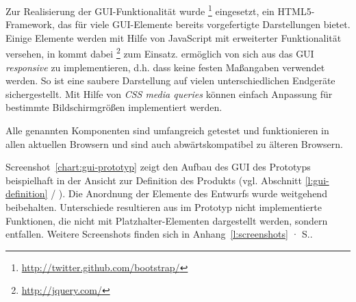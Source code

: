 Zur Realisierung der GUI-Funktionalität wurde \footnote{\url{http://twitter.github.com/bootstrap/}} eingesetzt, ein HTML5-Framework, das für viele GUI-Elemente bereits vorgefertigte Darstellungen bietet. Einige Elemente werden mit Hilfe von JavaScript mit erweiterter Funktionalität versehen, in  kommt dabei \footnote{\url{http://jquery.com/}} zum Einsatz.  ermöglich von sich aus das GUI \emph{responsive} zu implementieren, d.h. dass keine festen Maßangaben verwendet werden. So ist eine saubere Darstellung auf vielen unterschiedlichen Endgeräte sichergestellt. Mit Hilfe von \emph{CSS media queries} können einfach Anpassung für bestimmte Bildschirmgrößen implementiert werden.

Alle genannten Komponenten sind umfangreich getestet und funktionieren in allen aktuellen Browsern und sind auch abwärtskompatibel zu älteren Browsern.

\setlength\fboxsep{2pt}
\setlength\fboxrule{0.5pt}

\begin{center}
\label{chart:gui-prototyp}
\end{center}

Screenshot~\ref{chart:gui-prototyp} zeigt den Aufbau des GUI des Prototyps beispielhaft in der Ansicht zur Definition des Produkts (vgl. Abschnitt \ref{l:gui-definition} / \pageref{l:gui-definition}). Die Anordnung der Elemente des Entwurfs wurde weitgehend beibehalten. Unterschiede resultieren aus im Prototyp nicht implementierte Funktionen, die nicht mit Platzhalter-Elementen dargestellt werden, sondern entfallen. Weitere Screenshots finden sich in Anhang~\ref{l:screenshots} · S.\pageref{l:screenshots}.

